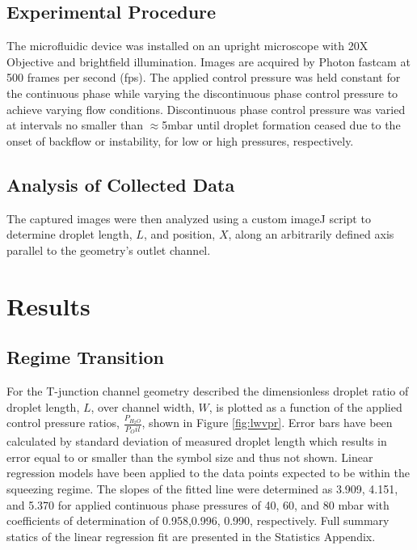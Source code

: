\subsection{Experimental Procedure}

The microfluidic device was installed on an upright microscope with 20X Objective and brightfield illumination. Images are acquired by Photon fastcam at 500 frames per second (fps). The applied control pressure was held constant for the continuous phase while varying the discontinuous phase control pressure to achieve varying flow conditions. Discontinuous phase control pressure was varied at intervals no smaller than $\approx$5mbar until droplet formation ceased due to the onset of backflow or instability, for low or high pressures, respectively. 

\subsection{Analysis of Collected Data}

The captured images were then analyzed using a custom imageJ script to determine droplet length, $L$, and position, $X$, along an arbitrarily defined axis parallel to the geometry's outlet channel.

\section{Results}
\label{sec:results}

\subsection{Regime Transition}

For the T-junction channel geometry described the dimensionless droplet ratio of droplet length, $L$, over channel width, $W$, is plotted as a function of the applied control pressure ratios, $\frac{P_{H_2O}}{P_Oil}$, shown in Figure \vref{fig:lwvpr}. Error bars have been calculated by standard deviation of measured droplet length which results in error equal to or smaller than the symbol size and thus not shown. Linear regression models have been applied to the data points expected to be within the squeezing regime. The slopes of the fitted line were determined as 3.909, 4.151, and 5.370 for applied continuous phase pressures of 40, 60, and 80 mbar with coefficients of determination of 0.958,0.996, 0.990, respectively. Full summary statics of the linear regression fit are presented in the Statistics Appendix.

